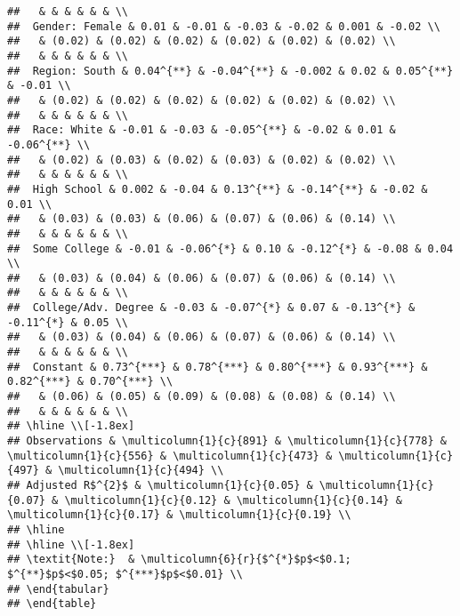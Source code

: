 \documentclass[
]{article}
\begin{document}
\begin{verbatim}
##   & & & & & & \\ 
##  Gender: Female & 0.01 & -0.01 & -0.03 & -0.02 & 0.001 & -0.02 \\ 
##   & (0.02) & (0.02) & (0.02) & (0.02) & (0.02) & (0.02) \\ 
##   & & & & & & \\ 
##  Region: South & 0.04^{**} & -0.04^{**} & -0.002 & 0.02 & 0.05^{**} & -0.01 \\ 
##   & (0.02) & (0.02) & (0.02) & (0.02) & (0.02) & (0.02) \\ 
##   & & & & & & \\ 
##  Race: White & -0.01 & -0.03 & -0.05^{**} & -0.02 & 0.01 & -0.06^{**} \\ 
##   & (0.02) & (0.03) & (0.02) & (0.03) & (0.02) & (0.02) \\ 
##   & & & & & & \\ 
##  High School & 0.002 & -0.04 & 0.13^{**} & -0.14^{**} & -0.02 & 0.01 \\ 
##   & (0.03) & (0.03) & (0.06) & (0.07) & (0.06) & (0.14) \\ 
##   & & & & & & \\ 
##  Some College & -0.01 & -0.06^{*} & 0.10 & -0.12^{*} & -0.08 & 0.04 \\ 
##   & (0.03) & (0.04) & (0.06) & (0.07) & (0.06) & (0.14) \\ 
##   & & & & & & \\ 
##  College/Adv. Degree & -0.03 & -0.07^{*} & 0.07 & -0.13^{*} & -0.11^{*} & 0.05 \\ 
##   & (0.03) & (0.04) & (0.06) & (0.07) & (0.06) & (0.14) \\ 
##   & & & & & & \\ 
##  Constant & 0.73^{***} & 0.78^{***} & 0.80^{***} & 0.93^{***} & 0.82^{***} & 0.70^{***} \\ 
##   & (0.06) & (0.05) & (0.09) & (0.08) & (0.08) & (0.14) \\ 
##   & & & & & & \\ 
## \hline \\[-1.8ex] 
## Observations & \multicolumn{1}{c}{891} & \multicolumn{1}{c}{778} & \multicolumn{1}{c}{556} & \multicolumn{1}{c}{473} & \multicolumn{1}{c}{497} & \multicolumn{1}{c}{494} \\ 
## Adjusted R$^{2}$ & \multicolumn{1}{c}{0.05} & \multicolumn{1}{c}{0.07} & \multicolumn{1}{c}{0.12} & \multicolumn{1}{c}{0.14} & \multicolumn{1}{c}{0.17} & \multicolumn{1}{c}{0.19} \\ 
## \hline 
## \hline \\[-1.8ex] 
## \textit{Note:}  & \multicolumn{6}{r}{$^{*}$p$<$0.1; $^{**}$p$<$0.05; $^{***}$p$<$0.01} \\ 
## \end{tabular} 
## \end{table}
\end{verbatim}
\end{document}

